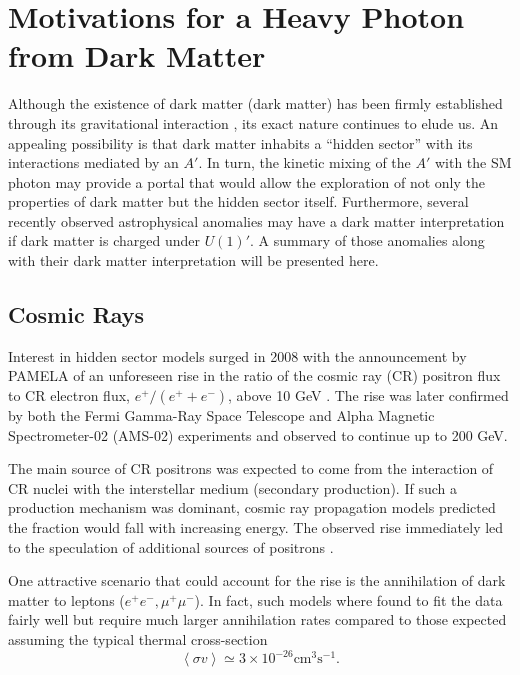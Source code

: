 \section{Motivations for a Heavy Photon from Dark Matter} \label{sec:mot_dm}

Although the existence of dark matter (dark matter) has been firmly established through its
gravitational interaction 
\cite{Zwicky:1933gu, Rubin:1980zd, Clowe:2006eq, Adam:2015rua}, its exact nature
continues to elude us. An appealing
possibility is that dark matter inhabits a ``hidden sector'' with its interactions 
mediated by an $A'$.  In turn, the kinetic mixing of the $A'$ with the SM 
photon may provide a portal that would allow the exploration of not only the 
properties of dark matter but the hidden sector itself.  Furthermore, several recently
observed astrophysical anomalies \cite{Adriani:2008zr, ackermann2012, aguilar2013, 
hooper2011, linden2011, abazajian2012, hooper2013, Bulbul:2014sua}
may have a dark matter interpretation if dark matter is
charged under $U(1)'$.  A summary of those anomalies along with their dark matter
interpretation will be presented here.

\subsection{Cosmic Rays}

Interest in hidden sector models surged in 2008 with the announcement by 
PAMELA of an unforeseen rise in the ratio of the cosmic ray (CR) positron flux
to CR electron flux, $e^{+}/(e^{+} + e^{-})$, above 10 GeV \cite{Adriani:2008zr}.
The rise was later confirmed by both the 
Fermi Gamma-Ray Space Telescope \cite{ackermann2012} and Alpha Magnetic 
Spectrometer-02 (AMS-02) \cite{aguilar2013} experiments and observed to continue
up to 200 GeV. 

The main source of CR positrons 
was expected to come from the interaction of CR nuclei with the interstellar 
medium (secondary production).  If such a production mechanism was dominant, 
cosmic ray propagation models predicted the fraction would fall with increasing
energy.  The observed rise immediately led to the speculation of additional sources of 
positrons \cite{yin2013, linden2013}.

One attractive scenario that could account for the rise is the annihilation of
dark matter to leptons ($e^+e^-, \mu^+\mu^-$). In fact, such models where found to fit 
the data fairly well but require much 
larger annihilation rates compared to those expected assuming the typical 
thermal cross-section \cite{Cholis:2008hb}
\begin{equation}
    \left \langle \sigma v \right \rangle \simeq 3 \times 10^{-26} \text{cm}^3 \text{s}^{-1}.
\end{equation}

